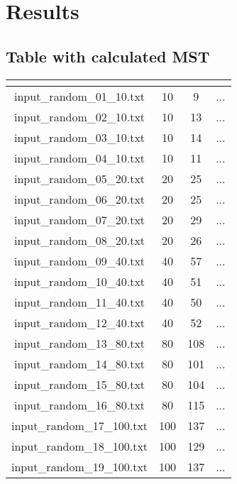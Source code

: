 \section{Results}\label{results}

\subsection{Table with calculated MST}
	
	\renewcommand{\arraystretch}{1.5}
	\begin{longtable}{|c|c|c|c|}
		\hline
		\rowcolor{title_row}
		\textbf{\color{title_text}{Input file}} &
		\textbf{\color{title_text}{num\_vertex}} & \textbf{\color{title_text}{num\_arches}} & \textbf{\color{title_text}{MST}}\\
		\hline
		\endhead
		input\_random\_01\_10.txt & 10 & 9 & ... \\ \hline 
		input\_random\_02\_10.txt & 10 & 13 & ... \\ \hline 
		input\_random\_03\_10.txt & 10 & 14 & ... \\ \hline
		input\_random\_04\_10.txt & 10 & 11 & ... \\ \hline
		input\_random\_05\_20.txt & 20 & 25 & ... \\ \hline
		input\_random\_06\_20.txt & 20 & 25 & ... \\ \hline
		input\_random\_07\_20.txt & 20 & 29 & ... \\ \hline
		input\_random\_08\_20.txt & 20 & 26 & ... \\ \hline
		input\_random\_09\_40.txt & 40 & 57 & ... \\ \hline
		input\_random\_10\_40.txt & 40 & 51 & ... \\ \hline
		input\_random\_11\_40.txt & 40 & 50 & ... \\ \hline
		input\_random\_12\_40.txt & 40 & 52 & ... \\ \hline
		input\_random\_13\_80.txt & 80 & 108 & ... \\ \hline
		input\_random\_14\_80.txt & 80 & 101 & ... \\ \hline
		input\_random\_15\_80.txt & 80 & 104 & ... \\ \hline
		input\_random\_16\_80.txt & 80 & 115 & ... \\ \hline
		input\_random\_17\_100.txt & 100 & 137 & ... \\ \hline
		input\_random\_18\_100.txt & 100 & 129 & ... \\ \hline
		input\_random\_19\_100.txt & 100 & 137 & ... \\ \hline

\end{longtable}
